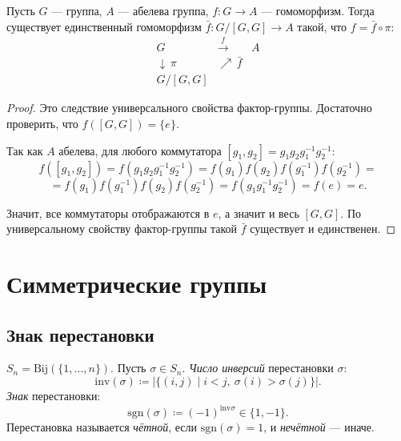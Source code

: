 \begin{stmt}
    Пусть $G$ --- группа, $A$ --- абелева группа, $f\colon G \to A$ --- гомоморфизм.
    Тогда существует единственный гомоморфизм $\bar{f}\colon G/[G,G] \to A$ такой, что $f = \bar{f} \circ \pi$:
    \[
        \begin{array}{ccc}
            G & \xrightarrow{\ f\ } & A \\
            \downarrow\, \pi & \nearrow\, \bar{f} & \\
            G/[G,G] & &
        \end{array}
    \]

    \begin{proof}
        Это следствие универсального свойства фактор-группы. Достаточно проверить, что $f([G,G]) = \{e\}$.

        Так как $A$ абелева, для любого коммутатора $[g_1, g_2] = g_1 g_2 g_1^{-1} g_2^{-1}$:
        \[
            f([g_1, g_2]) = f(g_1 g_2 g_1^{-1} g_2^{-1}) = f(g_1) f(g_2) f(g_1^{-1}) f(g_2^{-1}) =
        \]
        \[
            = f(g_1) f(g_1^{-1}) f(g_2) f(g_2^{-1}) = f(g_1 g_1^{-1} g_2^{-1}) = f(e) = e.
        \]

        Значит, все коммутаторы отображаются в $e$, а значит и весь $[G,G]$.
        По универсальному свойству фактор-группы такой $\bar{f}$ существует и единственен.
    \end{proof}
\end{stmt}


\section{Симметрические группы}

\subsection*{Знак перестановки}

\begin{definition}
    $S_n = \mathrm{Bij}(\{1, \ldots, n\}).$
    Пусть $\sigma \in S_n$. \emph{Число инверсий} перестановки $\sigma$:
    \[
        \mathrm{inv}(\sigma) \coloneqq \bigl|\{(i,j) \mid i < j,\ \sigma(i) > \sigma(j)\}\bigr|.
    \]
    \emph{Знак} перестановки:
    \[
        \mathrm{sgn}(\sigma) \coloneqq (-1)^{\mathrm{inv}{\sigma}} \in \{1, -1\}.
    \]
    Перестановка называется \emph{чётной}, если $\mathrm{sgn}(\sigma) = 1$, и \emph{нечётной} --- иначе.
\end{definition}

